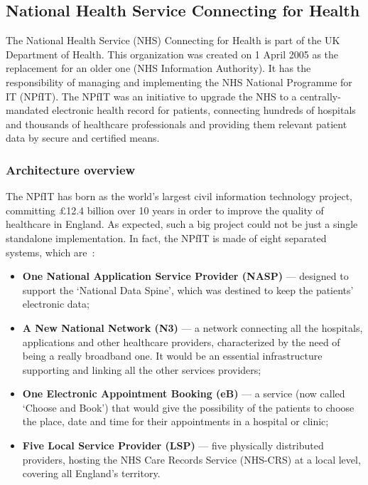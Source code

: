\subsection{National Health Service Connecting for Health}

The National Health Service (NHS) Connecting for Health is part of the UK Department of Health. This organization was created on 1 April 2005 as the replacement for an older one (NHS Information Authority). It has the responsibility of managing and implementing the NHS National Programme for IT (NPfIT). The NPfIT was an initiative to upgrade the NHS to a centrally-mandated electronic health record  for patients, connecting hundreds of hospitals and thousands of healthcare professionals and providing them relevant patient data by secure and certified means.


\subsubsection{Architecture overview}

The NPfIT has born as the world's largest civil information technology project, committing £12.4 billion over 10 years in order to improve the quality of healthcare in England. As expected, such a big project could not be just a single standalone implementation. In fact, the NPfIT is made of eight separated systems, which are~\citep{Brennan2005}: 
\begin{itemize}
\item \textbf{One National Application Service Provider (NASP)} --- designed to support the `National Data Spine', which was destined to keep the patients' electronic data;
\item \textbf{A New National Network (N3)} --- a network connecting all the hospitals, applications and other healthcare providers, characterized by the need of being a really broadband one. It would be an essential infrastructure supporting and linking all the other services providers;
\item \textbf{One Electronic Appointment Booking (eB)} --- a service (now called `Choose and Book') that would give the possibility of the patients to choose the place, date and time for their appointments in a hospital or clinic;
\item \textbf{Five Local Service Provider (LSP)} --- five physically distributed providers, hosting the NHS Care Records Service (NHS-CRS) at a local level, covering all England's territory.
\end{itemize}

